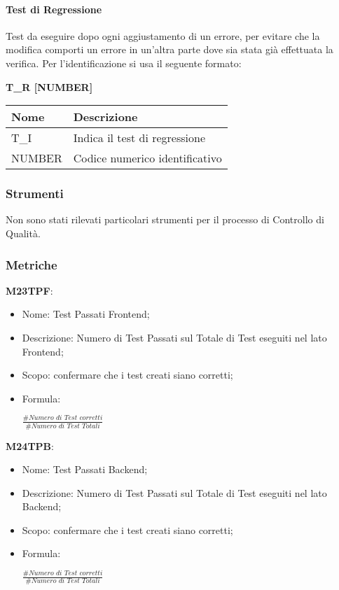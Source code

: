\paragraph{Test di Regressione}  \hfill \break
Test da eseguire dopo ogni aggiustamento di un errore, per evitare che la modifica comporti un errore in 
un’altra parte dove sia stata già effettuata la verifica.\newline
Per l’identificazione si usa il seguente formato:
\begin{center}
    \textbf{T\_R [NUMBER]}
\end{center}
\renewcommand{\arraystretch}{1.8} 
 \begin{tabular}{ |m{7em}|m{30em}| }
        \hline
        \textbf{Nome} & \textbf{Descrizione} \\
        \hline
            T\_I & Indica il test di regressione \\
        \hline
            NUMBER & Codice numerico identificativo \\
        \hline
 \end{tabular}

 \subsubsection{Strumenti}
 Non sono stati rilevati particolari strumenti per il processo di Controllo di Qualità.
 \subsubsection{Metriche} 
 \textbf{M23TPF}:
 \begin{itemize}
   \item Nome: Test Passati Frontend;
   \item Descrizione: Numero di Test Passati sul Totale di Test eseguiti nel lato Frontend;
   \item Scopo: confermare che i test creati siano corretti;
   \item Formula:
   \begin{center}
   $ \frac{\textit{\#Numero di Test corretti}}{\textit{\#Numero di Test Totali}}$
   \end{center}
 \end{itemize}

 \textbf{M24TPB}:
 \begin{itemize}
   \item Nome: Test Passati Backend;
   \item Descrizione: Numero di Test Passati sul Totale di Test eseguiti nel lato Backend;
   \item Scopo: confermare che i test creati siano corretti;
   \item Formula:
   \begin{center}
   $ \frac{\textit{\#Numero di Test corretti}}{\textit{\#Numero di Test Totali}}$
   \end{center}
 \end{itemize}